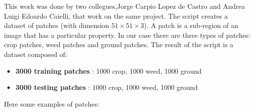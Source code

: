 \documentclass[]{report}
\begin{document}
This work was done by two collegues,Jorge Carpio Lopez de Castro and  Andrea Luigi Edoardo Caielli, that work on the same project. 
The script creates a dataset of patches (with dimension $ 51\times51\times3 $). A patch is a sub-region of an image that has a particular property. In our case there are three types of patches: crop patches, weed patches and ground patches. The result of the script is a dataset composed of:

\begin{itemize}
	\item \textbf{3000 training patches} : 1000 crop, 1000 weed, 1000 ground 
	\item \textbf{3000 testing patches} : 1000 crop, 1000 weed, 1000 ground
\end{itemize}

Here some examples of patches:
\end{document}
